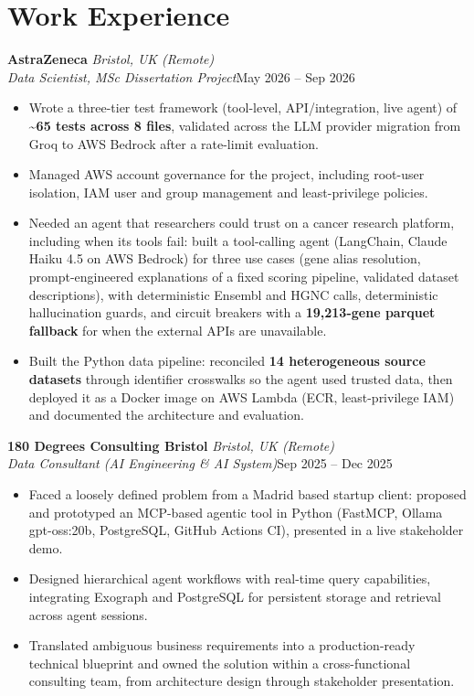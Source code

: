 \documentclass[a4paper,11pt]{article}
\newcommand{\role}[4]{%
  \textbf{#1}{\color{muted}\,\textperiodcentered\,\textit{#2}}\\
  \textit{#4}\hfill{\color{muted}#3}\par}
\newcommand{\gap}{\vspace{5pt}}
\newcommand{\num}[1]{\textbf{#1}}   %
\begin{document}
\section{Work Experience}
\role{AstraZeneca}{Bristol, UK (Remote)}{May 2026 – Sep 2026}{Data Scientist, MSc Dissertation Project}
\begin{itemize}
  \item Wrote a three-tier test framework (tool-level, API/integration, live agent) of \num{\textasciitilde{}65 tests across 8 files}, validated across the LLM provider migration from Groq to AWS Bedrock after a rate-limit evaluation.
  \item Managed AWS account governance for the project, including root-user isolation, IAM user and group management and least-privilege policies.
  \item Needed an agent that researchers could trust on a cancer research platform, including when its tools fail: built a tool-calling agent (LangChain, Claude Haiku 4.5 on AWS Bedrock) for three use cases (gene alias resolution, prompt-engineered explanations of a fixed scoring pipeline, validated dataset descriptions), with deterministic Ensembl and HGNC calls, deterministic hallucination guards, and circuit breakers with a \num{19,213-gene parquet fallback} for when the external APIs are unavailable.
  \item Built the Python data pipeline: reconciled \num{14 heterogeneous source datasets} through identifier crosswalks so the agent used trusted data, then deployed it as a Docker image on AWS Lambda (ECR, least-privilege IAM) and documented the architecture and evaluation.
\end{itemize}
\gap
{}
\role{180 Degrees Consulting Bristol}{Bristol, UK (Remote)}{Sep 2025 – Dec 2025}{Data Consultant (AI Engineering \& AI System)}
\begin{itemize}
  \item Faced a loosely defined problem from a Madrid based startup client: proposed and prototyped an MCP-based agentic tool in Python (FastMCP, Ollama gpt-oss:20b, PostgreSQL, GitHub Actions CI), presented in a live stakeholder demo.
  \item Designed hierarchical agent workflows with real-time query capabilities, integrating Exograph and PostgreSQL for persistent storage and retrieval across agent sessions.
  \item Translated ambiguous business requirements into a production-ready technical blueprint and owned the solution within a cross-functional consulting team, from architecture design through stakeholder presentation.
\end{itemize}
\end{document}
